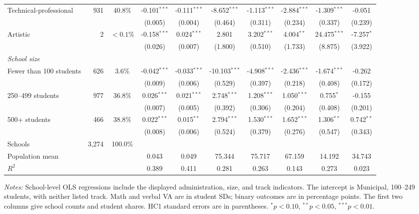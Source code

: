 \begin{table}[!htbp]
{\begin{tabular}{lrcccccccc}
Technical-professional & 931 & 40.8\% & -0.101$^{***}$ & -0.111$^{***}$ & -8.652$^{***}$ & -1.113$^{***}$ & -2.884$^{***}$ & -1.309$^{***}$ & -0.051 \\
 & & & (0.005) & (0.004) & (0.464) & (0.311) & (0.234) & (0.337) & (0.239) \\
Artistic & 2 & $<0.1\%$ & -0.158$^{***}$ & 0.024$^{***}$ & 2.801 & 3.202$^{***}$ & 4.004$^{**}$ & 24.475$^{***}$ & -7.257$^{*}$ \\
 & & & (0.026) & (0.007) & (1.800) & (0.510) & (1.733) & (8.875) & (3.922) \\
\multicolumn{10}{l}{\textit{School size}} \\
Fewer than 100 students & 626 & 3.6\% & -0.042$^{***}$ & -0.033$^{***}$ & -10.103$^{***}$ & -4.908$^{***}$ & -2.436$^{***}$ & -1.674$^{***}$ & -0.262 \\
 & & & (0.009) & (0.006) & (0.529) & (0.397) & (0.218) & (0.408) & (0.172) \\
250--499 students & 977 & 36.8\% & 0.026$^{***}$ & 0.021$^{***}$ & 2.748$^{***}$ & 1.208$^{***}$ & 1.050$^{***}$ & 0.755$^{*}$ & -0.155 \\
 & & & (0.007) & (0.005) & (0.392) & (0.306) & (0.204) & (0.408) & (0.201) \\
500+ students & 466 & 38.8\% & 0.022$^{***}$ & 0.015$^{**}$ & 2.794$^{***}$ & 1.530$^{***}$ & 1.652$^{***}$ & 1.306$^{**}$ & 0.742$^{**}$ \\
 & & & (0.008) & (0.006) & (0.524) & (0.379) & (0.276) & (0.547) & (0.343) \\
\midrule
Schools & 3,274 & 100.0\% &  &  &  &  &  &  &  \\
Population mean & & & 0.043 & 0.049 & 75.344 & 75.717 & 67.159 & 14.192 & 34.743 \\
$R^2$ & & & 0.389 & 0.411 & 0.281 & 0.263 & 0.143 & 0.273 & 0.023 \\
\bottomrule
\end{tabular}}
\par\medskip
\footnotesize
\begin{minipage}{\textwidth}
\textit{Notes:} School-level OLS regressions include the displayed administration, size, and track indicators. The intercept is Municipal, 100--249 students, with neither listed track. Math and verbal VA are in student SDs; binary outcomes are in percentage points. The first two columns give school counts and student shares. HC1 standard errors are in parentheses. $^{*}p<0.10$, $^{**}p<0.05$, $^{***}p<0.01$.
\end{minipage}
\end{table}

